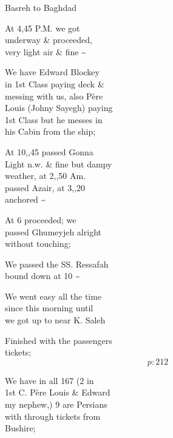 \documentclass{report}
\begin{document}
	\par{
 	Basreh to Baghdad\ \\
	}

	\par{
 	At 4,45 P.M. we got\ \\underway \& proceeded,\ \\very light air \& fine \~{}\ \\
	}

	\par{
 	We have Edward Blockey\ \\in 1st Class paying deck \&\ \\messing with us, also Père\ \\Louis (Johny Sayegh) paying\ \\1st Class but he messes in\ \\his Cabin from the ship;\ \\
	}

	\par{
 	At 10,,45 passed Gonna\ \\Light n.w. \& fine but dampy\ \\weather, at 2,,50 Am.\ \\passed Azair, at 3,,20\ \\anchored \~{}\ \\
	}

	\par{
 	At 6 proceeded; we\ \\passed Ghumeyjeh alright\ \\without touching;\ \\
	}

	\par{
 	We passed the SS. Ressafah\ \\bound down at 10 \~{}\ \\
	}

	\par{
 	We went easy all the time\ \\since this morning until\ \\we got up to near K. Saleh\ \\
	}

	\par{
 	Finished with the passengers\ \\tickets;\ \\
  \[p: 212 \]

	}



	\par{
 	We have in all 167 (2 in\ \\1st C. Père Louis \& Edward\ \\my nephew,) 9 are Persians\ \\with through tickets from\ \\Bushire;\ \\
	}
\end{document}
